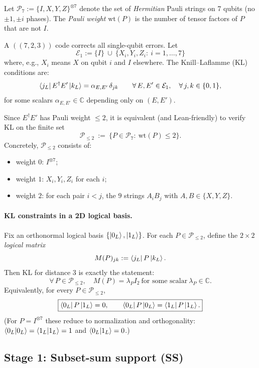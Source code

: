 \documentclass[11pt]{article}
\begin{document}
Let \(\mathcal{P}_7:=\{I,X,Y,Z\}^{\otimes 7}\) denote the set of \emph{Hermitian} Pauli strings on 7 qubits
(no \(\pm 1,\pm i\) phases).
The \emph{Pauli weight} \(\mathrm{wt}(P)\) is the number of tensor factors of \(P\) that are not \(I\).

A \(((7,2,3))\) code corrects all single-qubit errors. Let
\[
\mathcal{E}_1 := \{I\}\ \cup\ \{X_i,Y_i,Z_i:\ i=1,\dots,7\}
\]
where, e.g., \(X_i\) means \(X\) on qubit \(i\) and \(I\) elsewhere.
The Knill--Laflamme (KL) conditions are:
\[
\bra{j_L}E^\dagger E'\ket{k_L} = \alpha_{E,E'}\,\delta_{jk}
\qquad
\forall\,E,E'\in\mathcal{E}_1,\quad \forall\, j,k\in\{0,1\},
\]
for some scalars \(\alpha_{E,E'}\in\mathbb{C}\) depending only on \((E,E')\).

Since \(E^\dagger E'\) has Pauli weight \(\le 2\), it is equivalent (and Lean-friendly) to verify KL
on the finite set
\[
\mathcal{P}_{\le 2}
\ :=\ \{P\in\mathcal{P}_7:\ \mathrm{wt}(P)\le 2\}.
\]
Concretely, \(\mathcal{P}_{\le 2}\) consists of:
\begin{itemize}
\item weight \(0\): \(I^{\otimes 7}\);
\item weight \(1\): \(X_i,Y_i,Z_i\) for each \(i\);
\item weight \(2\): for each pair \(i<j\), the \(9\) strings \(A_iB_j\) with \(A,B\in\{X,Y,Z\}\).
\end{itemize}

\paragraph{KL constraints in a 2D logical basis.}
Fix an orthonormal logical basis \(\{\ket{0_L},\ket{1_L}\}\).
For each \(P\in\mathcal{P}_{\le 2}\), define the \(2\times 2\) \emph{logical matrix}
\[
M(P)_{jk} := \bra{j_L}P\ket{k_L}.
\]
Then KL for distance \(3\) is exactly the statement:
\[
\boxed{
\forall\,P\in\mathcal{P}_{\le 2},\quad
M(P)=\lambda_P I_2\ \text{for some scalar}\ \lambda_P\in\mathbb{C}.
}
\]
Equivalently, for every \(P\in\mathcal{P}_{\le 2}\),
\[
\boxed{
\bra{0_L}P\ket{1_L}=0,
\qquad
\bra{0_L}P\ket{0_L}=\bra{1_L}P\ket{1_L}.
}
\]
(For \(P=I^{\otimes 7}\) these reduce to normalization and orthogonality:
\(\braket{0_L|0_L}=\braket{1_L|1_L}=1\) and \(\braket{0_L|1_L}=0\).)

\subsection{Stage 1: Subset-sum support (SS)}
\end{document}
